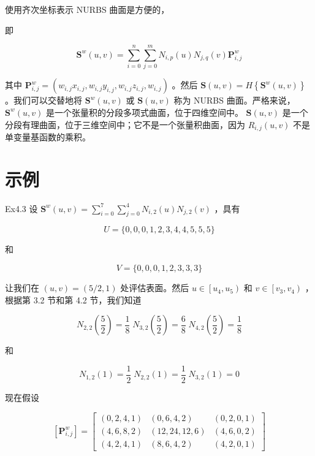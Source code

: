 \documentclass[../main.tex]{subfiles}
\begin{document}
使用齐次坐标表示 NURBS 曲面是方便的，

即

\[
{\mathbf{S}}^{w}\left( {u,v}\right)  = \mathop{\sum }\limits_{{i = 0}}^{n}\mathop{\sum }\limits_{{j = 0}}^{m}{N}_{i,p}\left( u\right) {N}_{j,q}\left( v\right) {\mathbf{P}}_{i,j}^{w} \tag{4.15}
\]

其中 \({\mathbf{P}}_{i,j}^{w} = \left( {{w}_{i,j}{x}_{i,j},{w}_{i,j}{y}_{i,j},{w}_{i,j}{z}_{i,j},{w}_{i,j}}\right)\) 。然后 \(\mathbf{S}\left( {u,v}\right)  = H\left\{  {{\mathbf{S}}^{w}\left( {u,v}\right) }\right\}\) 。我们可以交替地将 \({\mathbf{S}}^{w}\left( {u,v}\right)\) 或 \(\mathbf{S}\left( {u,v}\right)\) 称为 NURBS 曲面。严格来说， \({\mathbf{S}}^{w}\left( {u,v}\right)\) 是一个张量积的分段多项式曲面，位于四维空间中。 \(\mathbf{S}\left( {u,v}\right)\) 是一个分段有理曲面，位于三维空间中；它不是一个张量积曲面，因为 \({R}_{i,j}\left( {u,v}\right)\) 不是单变量基函数的乘积。

\section*{示例}

Ex4.3 设 \({\mathbf{S}}^{w}\left( {u,v}\right)  = \mathop{\sum }\limits_{{i = 0}}^{7}\mathop{\sum }\limits_{{j = 0}}^{4}{N}_{i,2}\left( u\right) {N}_{j,2}\left( v\right)\) ，具有

\[
U = \{ 0,0,0,1,2,3,4,4,5,5,5\}
\]

和

\[
V = \{ 0,0,0,1,2,3,3,3\}
\]

让我们在 \(\left( {u,v}\right)  = \left( {5/2,1}\right)\) 处评估表面。然后 \(u \in  \left\lbrack  {{u}_{4},{u}_{5}}\right)\) 和 \(v \in  \left\lbrack  {{v}_{3},{v}_{4}}\right)\) ，根据第 3.2 节和第 4.2 节，我们知道

\[
{N}_{2,2}\left( \frac{5}{2}\right)  = \frac{1}{8}\;{N}_{3,2}\left( \frac{5}{2}\right)  = \frac{6}{8}\;{N}_{4,2}\left( \frac{5}{2}\right)  = \frac{1}{8}
\]



和

\[
{N}_{1,2}\left( 1\right)  = \frac{1}{2}\;{N}_{2,2}\left( 1\right)  = \frac{1}{2}\;{N}_{3,2}\left( 1\right)  = 0
\]

现在假设

\[
\left\lbrack  {\mathbf{P}}_{i,j}^{w}\right\rbrack   = \left\lbrack  \begin{array}{lll} \left( {0,2,4,1}\right) & \left( {0,6,4,2}\right) & \left( {0,2,0,1}\right) \\  \left( {4,6,8,2}\right) & \left( {{12},{24},{12},6}\right) & \left( {4,6,0,2}\right) \\  \left( {4,2,4,1}\right) & \left( {8,6,4,2}\right) & \left( {4,2,0,1}\right)  \end{array}\right\rbrack
\]
\end{document}
